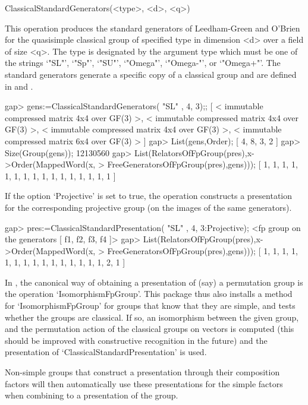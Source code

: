 \>ClassicalStandardGenerators(<type>, <d>, <q>)

This operation produces the standard generators of Leedham-Green and O'Brien
for the quasisimple classical group of specified type in dimension <d> over a
field of size <q>. The type is designated by the argument type which must be
one of the strings `"SL"', `"Sp"', `"SU"', `"Omega"', `"Omega-"', or
`"Omega+"'. The
standard generators generate a specific copy of a classical group and are
defined in \cite{LGO09} and \cite{DLLGO13}.

\beginexample
gap> gens:=ClassicalStandardGenerators( "SL" , 4, 3);;
[ < immutable compressed matrix 4x4 over GF(3) >,
  < immutable compressed matrix 4x4 over GF(3) >,
  < immutable compressed matrix 4x4 over GF(3) >,
  < immutable compressed matrix 6x4 over GF(3) > ]
gap> List(gens,Order);
[ 4, 8, 3, 2 ]
gap> Size(Group(gens));
12130560
gap> List(RelatorsOfFpGroup(pres),x->Order(MappedWord(x,
> FreeGeneratorsOfFpGroup(pres),gens)));
[ 1, 1, 1, 1, 1, 1, 1, 1, 1, 1, 1, 1, 1, 1, 1, 1 ]
\endexample

If the option `Projective' is set to true, the operation constructs a
presentation for the corresponding projective group (on the images of the
same generators).

\beginexample
gap> pres:=ClassicalStandardPresentation( "SL" , 4, 3:Projective);
<fp group on the generators [ f1, f2, f3, f4 ]>
gap> List(RelatorsOfFpGroup(pres),x->Order(MappedWord(x,
> FreeGeneratorsOfFpGroup(pres),gens)));
[ 1, 1, 1, 1, 1, 1, 1, 1, 1, 1, 1, 1, 1, 1, 1, 2, 1 ]
\endexample


In {\GAP}, the canonical way of obtaining a presentation of (say) a
permutation group is the operation `IsomorphismFpGroup'. This package thus
also installs a method for `IsomorphismFpGroup' for groups that know that
they are simple, and tests whether the groups are classical. If so, an
isomorphism between the given group, and the permutation action of the
classical groups on vectors is computed (this should be improved with
constructive recognition in the future) and the presentation of
`ClassicalStandardPresentation' is used.

Non-simple groups that construct a presentation through their composition
factors will then automatically use these presentations for the simple
factors when combining to a presentation of the group.

